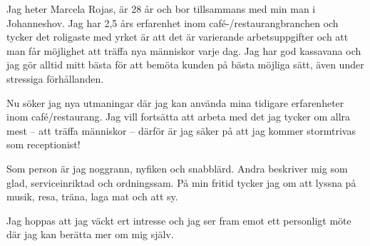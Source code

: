 \documentclass[11pt,a4paper,sans]{moderncv}        %
\begin{document}
Jag heter Marcela Rojas, är 28 år och bor tillsammans med min man i Johanneshov. Jag har 2,5 års erfarenhet inom café-/restaurangbranchen och tycker det roligaste med yrket är att det är varierande arbetsuppgifter och att man får möjlighet att träffa nya människor varje dag. Jag har god kassavana och jag gör alltid mitt bästa för att bemöta kunden på bästa möjliga sätt, även under stressiga förhållanden.

Nu söker jag nya utmaningar där jag kan använda mina tidigare erfarenheter inom café/restaurang. Jag vill fortsätta att arbeta med det jag tycker om allra mest -- att träffa människor -- därför är jag säker på att jag kommer stormtrivas som receptionist!

Som person är jag noggrann, nyfiken och snabblärd. Andra beskriver mig som glad, serviceinriktad och ordningssam. På min fritid tycker jag om att lyssna på musik, resa, träna, laga mat och att sy.

Jag hoppas att jag väckt ert intresse och jag ser fram emot ett personligt möte där jag kan berätta mer om mig själv.

\makeletterclosing

\end{document}
